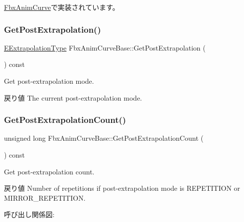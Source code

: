 \hyperlink{class_fbx_anim_curve_a8982eaf744608ac38457fd6f87990044}{Fbx\+Anim\+Curve}で実装されています。

\mbox{\label{class_fbx_anim_curve_base_acabeaab2cff8753d0411eb0b4e268dc5}} 
\subsubsection{\texorpdfstring{Get\+Post\+Extrapolation()}{GetPostExtrapolation()}}
{\footnotesize\ttfamily \hyperlink{class_fbx_anim_curve_base_aa7214d43daa7b6b9b47a8118a858847f}{E\+Extrapolation\+Type} Fbx\+Anim\+Curve\+Base\+::\+Get\+Post\+Extrapolation (\begin{DoxyParamCaption}{ }\end{DoxyParamCaption}) const}

Get post-\/extrapolation mode. \begin{DoxyReturn}{戻り値}
The current post-\/extrapolation mode. 
\end{DoxyReturn}
\mbox{\label{class_fbx_anim_curve_base_a2ccd05e435a7f010759c947815c55475}} 
\subsubsection{\texorpdfstring{Get\+Post\+Extrapolation\+Count()}{GetPostExtrapolationCount()}}
{\footnotesize\ttfamily unsigned long Fbx\+Anim\+Curve\+Base\+::\+Get\+Post\+Extrapolation\+Count (\begin{DoxyParamCaption}{ }\end{DoxyParamCaption}) const}

Get post-\/extrapolation count. \begin{DoxyReturn}{戻り値}
Number of repetitions if post-\/extrapolation mode is R\+E\+P\+E\+T\+I\+T\+I\+ON or M\+I\+R\+R\+O\+R\+\_\+\+R\+E\+P\+E\+T\+I\+T\+I\+ON. 
\end{DoxyReturn}
呼び出し関係図\+:
\mbox{\label{class_fbx_anim_curve_base_a3d4ba8f60385e14877c370518acea5d3}} 
